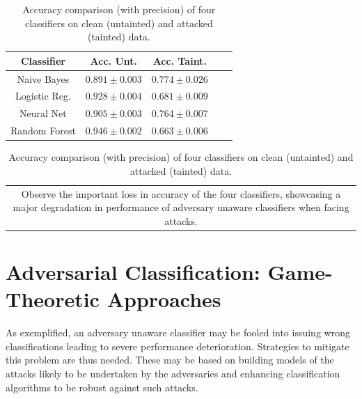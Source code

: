\begin{table}[H]
\caption{Accuracy comparison (with precision) 
 	of four classifiers on clean
 	(untainted) and attacked (tainted) data.}
	\centering
	\begin{tabular}{ccccc}
		\toprule
		\textbf{Classifier} & \textbf{ Acc. Unt.} & \textbf{Acc. Taint.}  \\
		\midrule
		Naive Bayes   & $0.891 \pm 0.003$ & $0.774\pm 0.026$  \\
		Logistic Reg.  & $0.928 \pm 0.004$ & $0.681 \pm 0.009$    \\  
		Neural Net & $0.905 \pm 0.003$ &      $0.764 \pm 0.007$       \\
		Random Forest  & $0.946 \pm 0.002$  &    $0.663 \pm 0.006$       \\
		\bottomrule
	\end{tabular}%
	
	\begin{tabular}{@{}c@{}} 
\multicolumn{1}{p{\textwidth -.88in}}{\footnotesize Observe the important loss in accuracy of the four classifiers, showcasing a major degradation in performance of adversary unaware classifiers when facing attacks.}
\end{tabular}
	\label{tab:cleanVSattack}%
\end{table}



\section{Adversarial Classification: Game-Theoretic Approaches}\label{sec:ac_ac}

As exemplified, an adversary unaware classifier may be fooled into issuing wrong classifications leading to severe performance deterioration. Strategies to mitigate this problem are thus needed. These may be based on 
building models of the attacks likely to be undertaken by the adversaries and enhancing classification algorithms to be robust against such attacks.%

